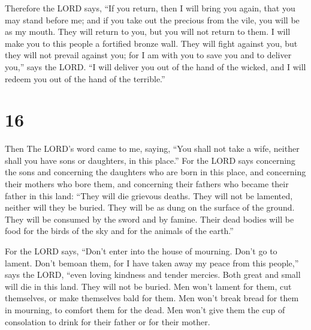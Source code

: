  Therefore the LORD says, ``If you return, then I will
bring you again, that you may stand before me; and if you take out the
precious from the vile, you will be as my mouth. They will return to
you, but you will not return to them.  I will make you to
this people a fortified bronze wall. They will fight against you, but
they will not prevail against you; for I am with you to save you and to
deliver you,'' says the LORD.  ``I will deliver you out of
the hand of the wicked, and I will redeem you out of the hand of the
terrible.''

\hypertarget{section-15}{%
\section{16}\label{section-15}}

 Then The LORD's word came to me, saying,  ``You
shall not take a wife, neither shall you have sons or daughters, in this
place.''  For the LORD says concerning the sons and
concerning the daughters who are born in this place, and concerning
their mothers who bore them, and concerning their fathers who became
their father in this land:  ``They will die grievous deaths.
They will not be lamented, neither will they be buried. They will be as
dung on the surface of the ground. They will be consumed by the sword
and by famine. Their dead bodies will be food for the birds of the sky
and for the animals of the earth.''

 For the LORD says, ``Don't enter into the house of
mourning. Don't go to lament. Don't bemoan them, for I have taken away
my peace from this people,'' says the LORD, ``even loving kindness and
tender mercies.  Both great and small will die in this land.
They will not be buried. Men won't lament for them, cut themselves, or
make themselves bald for them.  Men won't break bread for
them in mourning, to comfort them for the dead. Men won't give them the
cup of consolation to drink for their father or for their mother.

